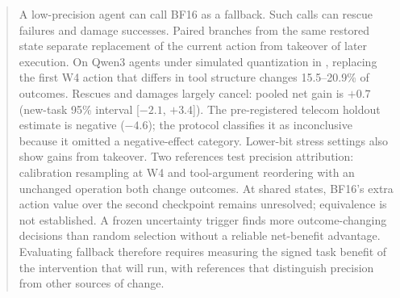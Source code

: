 \begin{abstract}
A low-precision agent can call BF16 as a fallback. Such calls can rescue failures and damage successes. Paired branches from the same restored state separate replacement of the current action from takeover of later execution. On Qwen3 agents under simulated quantization in \tautwo{}, replacing the first W4 action that differs in tool structure changes 15.5--20.9\% of outcomes. Rescues and damages largely cancel: pooled net gain is $+0.7$\pp{} (new-task 95\% interval [$-2.1$, $+3.4$]). The pre-registered telecom holdout estimate is negative ($-4.6$\pp{}); the protocol classifies it as inconclusive because it omitted a negative-effect category. Lower-bit stress settings also show gains from takeover. Two references test precision attribution: calibration resampling at W4 and tool-argument reordering with an unchanged operation both change outcomes. At shared states, BF16's extra action value over the second checkpoint remains unresolved; equivalence is not established. A frozen uncertainty trigger finds more outcome-changing decisions than random selection without a reliable net-benefit advantage. Evaluating fallback therefore requires measuring the signed task benefit of the intervention that will run, with references that distinguish precision from other sources of change.
\end{abstract}
